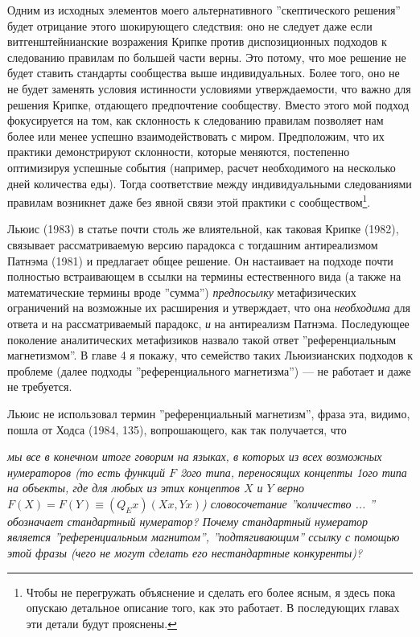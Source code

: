 \documentclass[11pt]{book}
\begin{document}
Одним из исходных элементов моего альтернативного ''скептического решения'' будет отрицание этого шокирующего следствия: оно не следует даже если витгенштейнианские возражения Крипке против диспозиционных подходов к следованию правилам по большей части верны. Это потому, что мое решение не будет ставить стандарты сообщества выше индивидуальных. Более того, оно не не будет заменять условия истинности условиями утверждаемости, что важно для решения Крипке, отдающего предпочтение сообществу. Вместо этого мой подход фокусируется на том, как склонность к следованию правилам позволяет нам более или менее успешно взаимодействовать с миром. Предположим, что их практики демонстрируют склонности, которые меняются, постепенно оптимизируя успешные события (например, расчет необходимого на несколько дней количества еды). Тогда соответствие между индивидуальными следованиями правилам возникнет даже без явной связи этой практики с сообществом\footnote{Чтобы не перегружать объяснение и сделать его более ясным, я здесь пока опускаю детальное описание того, как это работает. В последующих главах эти детали будут прояснены.}.

Льюис (1983) в статье почти столь же влиятельной, как таковая Крипке (1982), связывает рассматриваемую версию парадокса с тогдашним антиреализмом Патнэма (1981) и предлагает общее решение. Он настаивает на подходе почти полностью встраивающем в ссылки на термины естественного вида (а также на математические термины вроде ''сумма'') \textit{предпосылку} метафизических ограничений на возможные их расширения и утверждает, что она \textit{необходима} для ответа и на рассматриваемый парадокс, \textit{и} на антиреализм Патнэма. Последующее поколение аналитических метафизиков назвало такой ответ ''референциальным магнетизмом''. В главе 4 я покажу, что семейство таких Льюизианских подходов к проблеме (далее подходы ''референциального магнетизма'') --- не работает и даже не требуется.

Льюис не использовал термин ''референциальный магнетизм'', фраза эта, видимо, пошла от Ходса (1984, 135), вопрошающего, как так получается, что

\smallskip

\textit{мы все в конечном итоге говорим на языках, в которых из всех возможных нумераторов (то есть функций \begin{math}F\end{math} 2ого типа, переносящих концепты 1ого типа на объекты, где для любых из этих концептов \begin{math}X\end{math} и \begin{math}Y\end{math} верно \begin{math}F(X)=F(Y)\equiv (Q_{E}x)(Xx, Yx)\end{math}) словосочетание ''количество ... '' обозначает стандартный нумератор? Почему стандартный нумератор является ''референциальным магнитом'', ''подтягивающим'' ссылку с помощью этой фразы (чего не могут сделать его нестандартные конкуренты)?}
\end{document}
